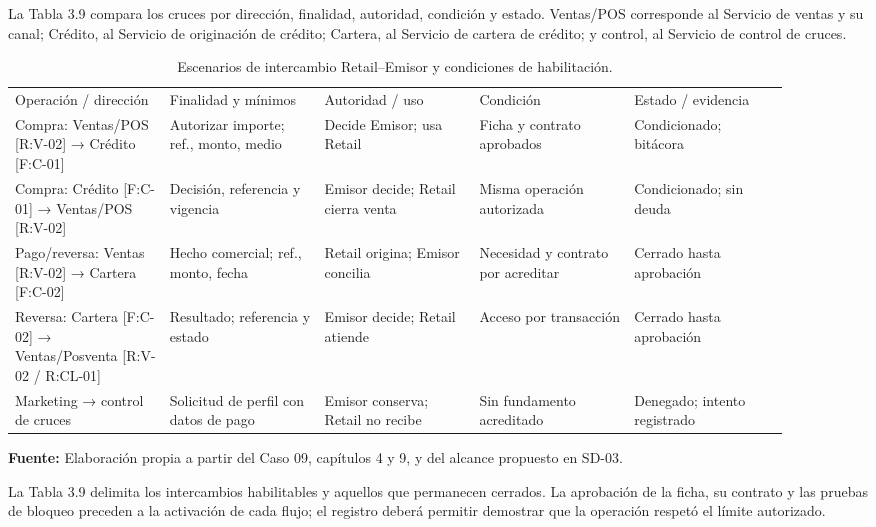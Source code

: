 \documentclass[11pt]{article}
\begin{document}
{La Tabla 3.9 compara los cruces por dirección, finalidad, autoridad, condición y estado. Ventas/POS corresponde al Servicio de ventas y su canal; Crédito, al Servicio de originación de crédito; Cartera, al Servicio de cartera de crédito; y control, al Servicio de control de cruces.}

\begin{longtable}{@{}p{0.18\linewidth}p{0.18\linewidth}p{0.18\linewidth}p{0.18\linewidth}p{0.18\linewidth}@{}}
\caption{Escenarios de intercambio Retail--Emisor y condiciones de habilitación.}\label{tab:3-9}\\
\toprule\noalign{}
\endhead
\bottomrule\noalign{}
\endlastfoot
{Operación / dirección} & {Finalidad y mínimos} & {Autoridad / uso} & {Condición} & {Estado / evidencia} \\
{Compra: Ventas/POS {[}R:V-02{]} → Crédito {[}F:C-01{]}} & {Autorizar importe; ref., monto, medio} & {Decide Emisor; usa Retail} & {Ficha y contrato aprobados} & {Condicionado; bitácora} \\
{Compra: Crédito {[}F:C-01{]} → Ventas/POS {[}R:V-02{]}} & {Decisión, referencia y vigencia} & {Emisor decide; Retail cierra venta} & {Misma operación autorizada} & {Condicionado; sin deuda} \\
{Pago/reversa: Ventas {[}R:V-02{]} → Cartera {[}F:C-02{]}} & {Hecho comercial; ref., monto, fecha} & {Retail origina; Emisor concilia} & {Necesidad y contrato por acreditar} & {Cerrado hasta aprobación} \\
{Reversa: Cartera {[}F:C-02{]} → Ventas/Posventa {[}R:V-02 / R:CL-01{]}} & {Resultado; referencia y estado} & {Emisor decide; Retail atiende} & {Acceso por transacción} & {Cerrado hasta aprobación} \\
{Marketing → control de cruces} & {Solicitud de perfil con datos de pago} & {Emisor conserva; Retail no recibe} & {Sin fundamento acreditado} & {Denegado; intento registrado} \\
\end{longtable}

{\raggedright\textbf{Fuente:} Elaboración propia a partir del Caso 09, capítulos 4 y 9, y del alcance propuesto en SD-03.\par}

{La Tabla 3.9 delimita los intercambios habilitables y aquellos que permanecen cerrados. La aprobación de la ficha, su contrato y las pruebas de bloqueo preceden a la activación de cada flujo; el registro deberá permitir demostrar que la operación respetó el límite autorizado.}
\end{document}
